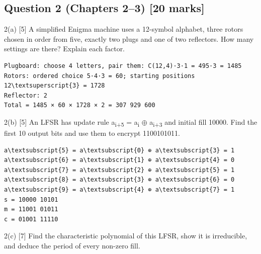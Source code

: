 \documentclass[11pt,a4paper]{article}
\begin{document}
\subsection*{Question 2 (Chapters 2–3) [20 marks]}
\begin{question}{2(a) \hfill\textnormal{\small [5]}}
A simplified Enigma machine uses a 12-symbol alphabet, three rotors chosen in order from five, exactly two plugs and one of two reflectors. How many settings are there? Explain each factor.\par
\end{question}
\begin{answer}
\begin{workbox}
\begin{Verbatim}[commandchars=\\\{\},fontsize=\footnotesize]
Plugboard: choose 4 letters, pair them: C(12,4)·3·1 = 495·3 = 1485
Rotors: ordered choice 5·4·3 = 60; starting positions 12\textsuperscript{3} = 1728
Reflector: 2
Total = 1485 × 60 × 1728 × 2 = 307 929 600
\end{Verbatim}
\end{workbox}
\end{answer}
\begin{question}{2(b) \hfill\textnormal{\small [5]}}
An LFSR has update rule a\textsubscript{i+5} = a\textsubscript{i} \ensuremath{\oplus} a\textsubscript{i+3} and initial fill 10000. Find the first 10 output bits and use them to encrypt 1100101011.\par
\end{question}
\begin{answer}
\begin{workbox}
\begin{Verbatim}[commandchars=\\\{\},fontsize=\footnotesize]
a\textsubscript{5} = a\textsubscript{0} ⊕ a\textsubscript{3} = 1   a\textsubscript{6} = a\textsubscript{1} ⊕ a\textsubscript{4} = 0   a\textsubscript{7} = a\textsubscript{2} ⊕ a\textsubscript{5} = 1
a\textsubscript{8} = a\textsubscript{3} ⊕ a\textsubscript{6} = 0   a\textsubscript{9} = a\textsubscript{4} ⊕ a\textsubscript{7} = 1
s = 10000 10101
m = 11001 01011
c = 01001 11110
\end{Verbatim}
\end{workbox}
\end{answer}
\begin{question}{2(c) \hfill\textnormal{\small [7]}}
Find the characteristic polynomial of this LFSR, show it is irreducible, and deduce the period of every non-zero fill.\par
\end{question}
\end{document}
